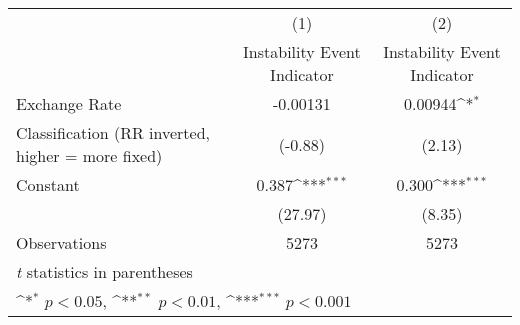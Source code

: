 {
\def\sym#1{\ifmmode^{#1}\else\(^{#1}\)\fi}
\begin{tabular}{l*{2}{c}}
\toprule
                &\multicolumn{1}{c}{(1)}&\multicolumn{1}{c}{(2)}\\
                &\multicolumn{1}{c}{Instability Event Indicator}&\multicolumn{1}{c}{Instability Event Indicator}\\
\midrule
Exchange Rate   & -0.00131         &  0.00944\sym{*}  \\
Classification (RR inverted, higher = more fixed)&  (-0.88)         &   (2.13)         \\
\addlinespace
Constant        &    0.387\sym{***}&    0.300\sym{***}\\
                &  (27.97)         &   (8.35)         \\
\midrule
Observations    &     5273         &     5273         \\
\bottomrule
\multicolumn{3}{l}{\footnotesize \textit{t} statistics in parentheses}\\
\multicolumn{3}{l}{\footnotesize \sym{*} \(p<0.05\), \sym{**} \(p<0.01\), \sym{***} \(p<0.001\)}\\
\end{tabular}
}
